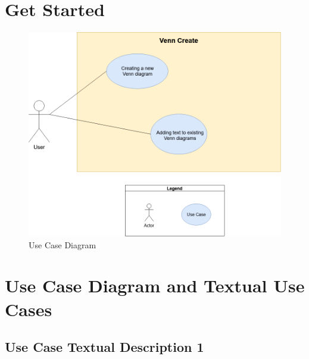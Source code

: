 \documentclass[fontsize=12pt,paper=letter,twoside]{scrartcl}
\begin{document}
\newpage
\section{Get Started}

\begin{figure}[hbt]
	\begin{mdframed}
		\includegraphics[width=\textwidth]{images/use-case-diagram.png}
	\end{mdframed}
	\caption{Use Case Diagram}
\end{figure}


\newpage
\section{Use Case Diagram and Textual Use Cases}



\newpage

\subsection*{Use Case Textual Description 1}
\end{document}

